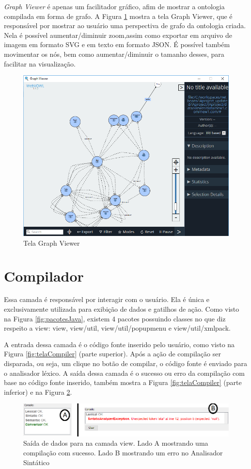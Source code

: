 \documentclass{bcc}
\begin{document}
\textit{Graph Viewer} é apenas um facilitador gráfico, afim de mostrar a ontologia compilada em forma de grafo. A Figura \ref{fig:telGraph}
mostra a tela Graph Viewer, que é responsável por mostrar ao usuário uma perspectiva de grafo da ontologia criada. Nela é possível aumentar/diminuir zoom,assim como exportar em arquivo de imagem em formato SVG e em texto em formato JSON. É possível também movimentar os nós, bem como aumentar/diminuir o tamanho desses, para facilitar na visualização.

\begin{figure}[H]
\centering
\includegraphics[width=.7\textwidth]{Figuras/tela_graph.png}
\caption{Tela Graph Viewer}
\label{fig:telGraph}
\end{figure}

\section{Compilador}
Essa camada é responsável por interagir com o usuário. Ela é única e exclusivamente utilizada para exibição de dados e gatilhos de ação. Como visto na Figura \ref{fig:pacotesJava}, existem 4 pacotes possuindo classes no que diz respeito a view: view, view/util, view/util/popupmenu e view/util/xmlpack.


\iffalse
A entrada dessa camada é o código fonte inserido pelo usuário, como visto na Figura \ref{fig:telaCompiler} (parte superior). Após a ação de compilação ser disparada, ou seja, um clique no botão de compilar, o código  fonte é enviado para o analisador léxico. A saída dessa camada é o sucesso ou erro da compilação com base no código fonte inserido, também mostra a Figura \ref{fig:telaCompiler} (parte inferior) e na Figura \ref{fig:telaCompilerSaida}.
\begin{figure}[H]
\centering
\includegraphics[width=.7\textwidth]{Figuras/tela_compiler_saida.png}
\caption{Saída de dados para na camada view. Lado A mostrando uma compilação com sucesso. Lado B mostrando um erro no Analisador Sintático}
\label{fig:telaCompilerSaida}
\end{figure}
\end{document}
